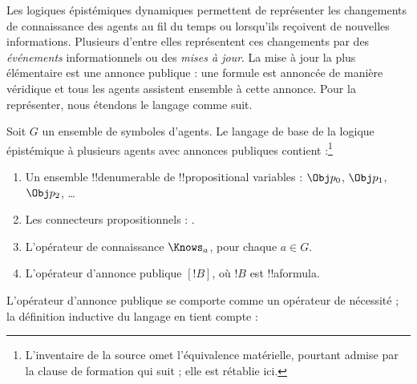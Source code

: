 \documentclass[../../../include/open-logic-section]{subfiles}
\begin{document}


Les logiques épistémiques dynamiques permettent de représenter les
changements de connaissance des agents au fil du temps ou lorsqu'ils
reçoivent de nouvelles informations. Plusieurs d'entre elles représentent
ces changements par des \emph{événements} informationnels ou des
\emph{mises à jour}. La mise à jour la plus élémentaire est une annonce
publique : une formule est annoncée de manière véridique et tous les
agents assistent ensemble à cette annonce. Pour la représenter, nous
étendons le langage comme suit.

\begin{defn}
Soit $G$ un ensemble de symboles d'agents. Le langage de base de la
logique épistémique à plusieurs agents avec annonces publiques contient :\footnote{L'inventaire de la source omet l'équivalence matérielle, pourtant admise par la clause de formation qui suit ; elle est rétablie ici.}
\begin{enumerate}
  \item Un ensemble !!{denumerable} de !!{propositional variable}s : $\Obj
    p_0$, $\Obj p_1$, $\Obj p_2$, \dots
  \item Les connecteurs propositionnels : \startycommalist
  .
  \item L'opérateur de connaissance $\Knows_a$, pour chaque $a \in G$.
  \item L'opérateur d'annonce publique $[!B]$, où $!B$ est !!a{formula}.
\end{enumerate}
\end{defn}

L'opérateur d'annonce publique se comporte comme un opérateur de
nécessité ; la définition inductive du langage en tient compte :
\end{document}
